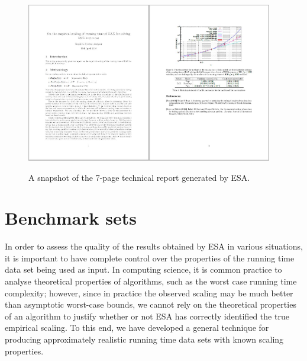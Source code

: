 \documentclass[aic]{iosart2x}
\begin{document}
\begin{figure}[t]
\begin{centering}
\includegraphics[width=0.48\textwidth]{ESA_output_1}\includegraphics[width=0.48\textwidth]{ESA_output_2}
\par\end{centering}

\caption{A snapshot of the 7-page technical report generated by ESA.}\label{fig:Snapshot-ESA-output}
\end{figure}


\section{Benchmark sets}
\label{sec:AA}

In order to assess the quality of the results obtained by ESA in various situations, it is important to have complete control over the properties of the running time data set being used as input. In computing science, it is common practice to analyse theoretical properties of algorithms, such as the worst case running time complexity; however, since in practice the observed scaling may be much better than asymptotic worst-case bounds, we cannot rely on the theoretical properties of an algorithm to justify whether or not ESA has correctly identified the true empirical scaling. To this end, we have developed a general technique for producing approximately realistic running time data sets with known scaling properties.
\end{document}
